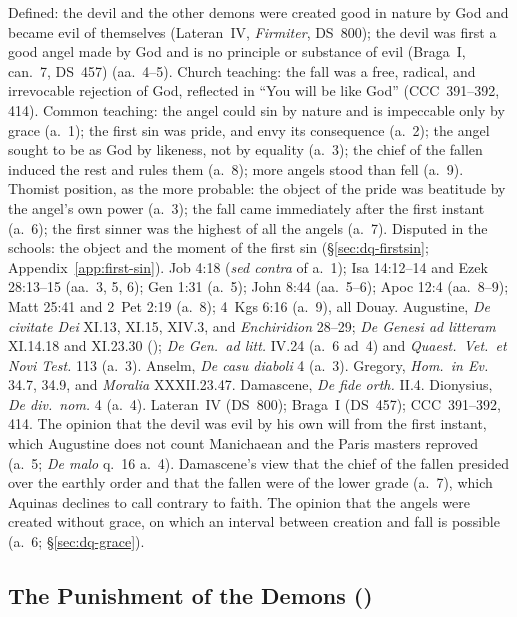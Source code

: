  {Defined: the devil and the other demons were created good in nature by
 God and became evil of themselves (Lateran~IV, \emph{Firmiter},
 DS~800); the devil was first a good angel made by God and is no
 principle or substance of evil (Braga~I, can.~7, DS~457) (aa.~4--5).
 Church teaching: the fall was a free, radical, and irrevocable
 rejection of God, reflected in ``You will be like God'' (CCC~391--392,
 414). Common teaching: the angel could sin by nature and is impeccable
 only by grace (a.~1); the first sin was pride, and envy its consequence
 (a.~2); the angel sought to be as God by likeness, not by equality
 (a.~3); the chief of the fallen induced the rest and rules them (a.~8);
 more angels stood than fell (a.~9). Thomist position, as the more
 probable: the object of the pride was beatitude by the angel's own
 power (a.~3); the fall came immediately after the first instant (a.~6);
 the first sinner was the highest of all the angels (a.~7). Disputed in
 the schools: the object and the moment of the first sin
 (\S\ref{sec:dq-firstsin}; Appendix~\ref{app:first-sin}).}
 {Job 4:18 (\emph{sed contra} of a.~1); Isa 14:12--14 and Ezek 28:13--15
 (aa.~3, 5, 6); Gen 1:31 (a.~5); John 8:44 (aa.~5--6); Apoc 12:4
 (aa.~8--9); Matt 25:41 and 2~Pet 2:19 (a.~8); 4~Kgs 6:16 (a.~9), all
 Douay. Augustine, \emph{De civitate Dei} XI.13, XI.15, XIV.3, and
 \emph{Enchiridion} 28--29; \emph{De Genesi ad litteram} XI.14.18 and
 XI.23.30 (); \emph{De Gen.\ ad litt.} IV.24
 (a.~6 ad~4) and \emph{Quaest.\ Vet.\ et Novi Test.} 113 (a.~3). Anselm,
 \emph{De casu diaboli} 4 (a.~3). Gregory, \emph{Hom.~in Ev.} 34.7, 34.9,
 and \emph{Moralia} XXXII.23.47. Damascene, \emph{De fide orth.} II.4.
 Dionysius, \emph{De div.\ nom.} 4 (a.~4). Lateran~IV (DS~800); Braga~I
 (DS~457); CCC~391--392, 414.}
 {The opinion that the devil was evil by his own will from the first
 instant, which Augustine does not count Manichaean and the Paris
 masters reproved (a.~5; \emph{De malo} q.~16 a.~4). Damascene's view
 that the chief of the fallen presided over the earthly order and that
 the fallen were of the lower grade (a.~7), which Aquinas declines to
 call contrary to faith. The opinion that the angels were created
 without grace, on which an interval between creation and fall is
 possible (a.~6; \S\ref{sec:dq-grace}).}

\subsection{The Punishment of the Demons ()}\label{sec:q64}

